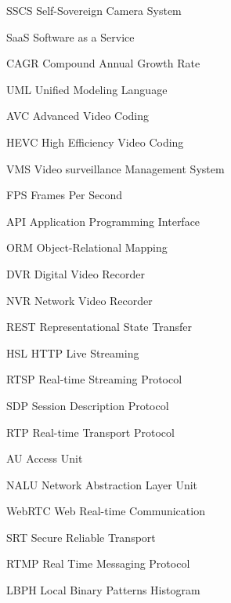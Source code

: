 \documentclass[12pt, %
openright, 
oneside, %
a4paper,    %
brazil]{facom-ufu-abntex2}
\begin{document}
\begin{siglas} %

	\item[SSCS] Self-Sovereign Camera System
	\item[SaaS] Software as a Service
	\item[CAGR] Compound Annual Growth Rate
	\item[UML] Unified Modeling Language
	\item[AVC] Advanced Video Coding
	\item[HEVC] High Efficiency Video Coding
	\item[VMS] Video surveillance Management System
	\item[FPS] Frames Per Second
	\item[API] Application Programming Interface
	\item[ORM] Object-Relational Mapping
	\item[DVR] Digital Video Recorder
	\item[NVR] Network Video Recorder
	\item[REST] Representational State Transfer
	\item[HSL] HTTP Live Streaming
	\item[RTSP] Real-time Streaming Protocol
	\item[SDP] Session Description Protocol
	\item[RTP] Real-time Transport Protocol
	\item[AU] Access Unit
	\item[NALU] Network Abstraction Layer Unit
	\item[WebRTC] Web Real-time Communication
	\item[SRT] Secure Reliable Transport
	\item[RTMP] Real Time Messaging Protocol
	\item[LBPH] Local Binary Patterns Histogram

\end{siglas}

\end{document}
